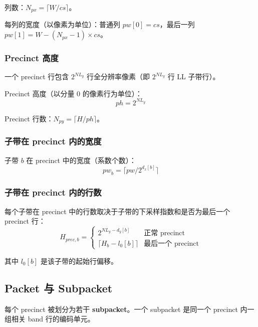 列数：$N_{px} = \lceil W / \mathit{cs} \rceil$。

每列的宽度（以像素为单位）：普通列 $pw[0] = \mathit{cs}$，最后一列 $pw[1] = W - (N_{px} - 1) \times \mathit{cs}$。

\subsubsection{Precinct 高度}

一个 precinct 行包含 $2^{NL_y}$ 行全分辨率像素（即 $2^{NL_y}$ 行 LL 子带行）。

Precinct 高度（以分量 0 的像素行为单位）：
\begin{equation}
\mathit{ph} = 2^{NL_y}
\end{equation}

Precinct 行数：$N_{py} = \lceil H / \mathit{ph} \rceil$。

\subsubsection{子带在 precinct 内的宽度}

子带 $b$ 在 precinct 中的宽度（系数个数）：
\begin{equation}
\mathit{pw}_b = \lceil \mathit{pw} / 2^{d_x[b]} \rceil
\end{equation}

\subsubsection{子带在 precinct 内的行数}

每个子带在 precinct 中的行数取决于子带的下采样指数和是否为最后一个 precinct 行：
\begin{equation}
H_{\mathit{prec},b} = \begin{cases} 2^{NL_y - d_y[b]} & \text{正常 precinct} \\ \lceil H_b - l_0[b] \rceil & \text{最后一个 precinct} \end{cases}
\end{equation}

其中 $l_0[b]$ 是该子带的起始行偏移。

\subsection{Packet 与 Subpacket}

每个 precinct 被划分为若干 \textbf{subpacket}。一个 subpacket 是同一个 precinct 内一组相关 band 行的编码单元。

